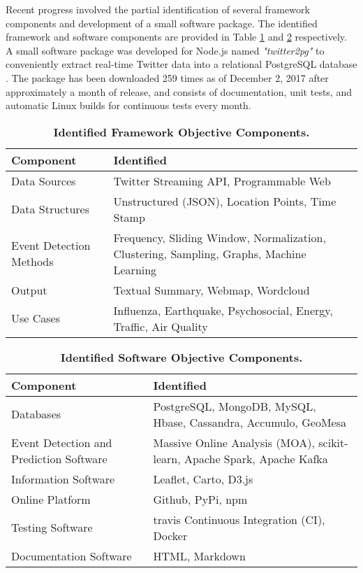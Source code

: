 Recent progress involved the partial identification of several framework components and development of a small software package. The identified framework and software components are provided in Table \ref{table:frameworkcomponents} and \ref{table:softwarecomponents} respectively. A small software package was developed for Node.js \citep{Nodejs:2017} named \textit{"twitter2pg"}  \citep{Wen:2017} to conveniently extract real-time Twitter data into a relational PostgreSQL database \citep{Postgresql:2017}. The package has been downloaded 259 times as of December 2, 2017 after approximately a month of release, and consists of documentation, unit tests, and automatic Linux builds for continuous tests every month.

\begin{table}[!htb]
\centering
\caption{\textbf{Identified Framework Objective Components.}}
\label{table:frameworkcomponents}
\begin{tabular}{|p{2.5in}|p{3.5in}|}
\hline
\textbf{Component} & \textbf{Identified}\\
\hline
Data Sources & Twitter Streaming API, Programmable Web\\
\hline
Data Structures & Unstructured (JSON), Location Points, Time Stamp \\
\hline
Event Detection Methods & Frequency, Sliding Window, Normalization, Clustering, Sampling, Graphs, Machine Learning\\
\hline
Output & Textual Summary, Webmap, Wordcloud\\
\hline
Use Cases & Influenza, Earthquake, Psychosocial, Energy, Traffic, Air Quality\\
\hline
\end{tabular}
\end{table}

\begin{table}[!htb]
\centering
\caption{\textbf{Identified Software Objective Components.}}
\label{table:softwarecomponents}
\begin{tabular}{|p{2.5in}|p{3.5in}|}
\hline
\textbf{Component} & \textbf{Identified}\\
\hline
Databases & PostgreSQL, MongoDB, MySQL, Hbase, Cassandra, Accumulo, GeoMesa\\
\hline
Event Detection and Prediction Software & Massive Online Analysis (MOA), scikit-learn, Apache Spark, Apache Kafka\\
\hline
Information Software & Leaflet, Carto, D3.js\\
\hline
Online Platform & Github, PyPi, npm\\
\hline
Testing Software & travis Continuous Integration (CI), Docker\\
\hline
Documentation Software & HTML, Markdown\\
\hline
\end{tabular}
\end{table}



